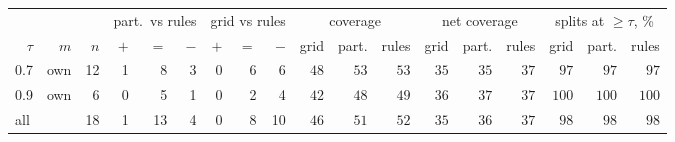 \begin{tabular}{rrr rrr rrr rrr rrr rrr}
\toprule
& & & \multicolumn{3}{c}{part.\ vs rules} & \multicolumn{3}{c}{grid vs rules} & \multicolumn{3}{c}{coverage} & \multicolumn{3}{c}{net coverage} & \multicolumn{3}{c}{splits at $\ge\tau$, \%}\\
\cmidrule(lr){4-6}\cmidrule(lr){7-9}\cmidrule(lr){10-12}\cmidrule(lr){13-15}\cmidrule(lr){16-18}
$\tau$ & $m$ & $n$ & $+$ & $=$ & $-$ & $+$ & $=$ & $-$ & grid & part. & rules & grid & part. & rules & grid & part. & rules\\
\midrule
0.7 & own & 12 & 1 & 8 & 3 & 0 & 6 & 6 & $48$ & $53$ & $53$ & $35$ & $35$ & $37$ & $97$ & $97$ & $97$\\
0.9 & own & 6 & 0 & 5 & 1 & 0 & 2 & 4 & $42$ & $48$ & $49$ & $36$ & $37$ & $37$ & $100$ & $100$ & $100$\\
\midrule
\multicolumn{2}{l}{all} & 18 & 1 & 13 & 4 & 0 & 8 & 10 & $46$ & $51$ & $52$ & $35$ & $36$ & $37$ & $98$ & $98$ & $98$\\
\bottomrule
\end{tabular}
